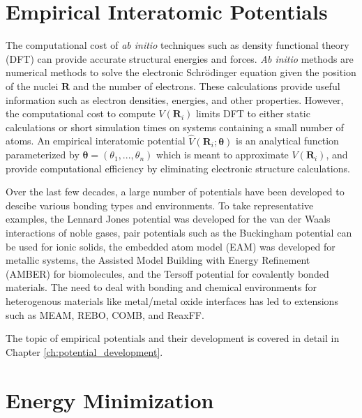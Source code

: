 \section{Empirical Interatomic Potentials}
The computational cost of \emph{ab initio} techniques such as density functional theory (DFT)\cite{hohenberg1964_dft,kohn1965_dft} can provide accurate structural energies and forces.    \emph{Ab initio} methods are numerical methods to solve the electronic Schr\"odinger equation given the position of the nuclei $\bm{R}$ and the number of electrons.  These calculations provide useful information such as electron densities, energies, and other properties. However, the computational cost to compute $V(\bm{R}_i)$  limits DFT to either static calculations or short simulation times on systems containing a small number of atoms.
An empirical interatomic potential $\hat{V}(\bm{R}_i;\bm{\theta})$ is an analytical function parameterized by $\bm{\theta}=(\theta_1,...,\theta_n)$ which is meant to approximate $V(\bm{R}_i)$, and provide computational efficiency by eliminating electronic structure calculations.

Over the last few decades, a large number of potentials have been developed to descibe various bonding types and environments.
To take representative examples, the Lennard Jones potential\cite{lennardjones1924_lj_pot} was developed for the van der Waals interactions of noble gases, pair potentials such as the Buckingham potential\cite{buckingham1938} can be used for ionic solids\cite{catlow1977_buckingham}, the embedded atom model (EAM)\cite{daw1983_eam,daw1984_eam} was developed for metallic systems,
the Assisted Model Building with Energy Refinement (AMBER)\cite{cornell1995_potential_amber} for biomolecules, and
the Tersoff potential\cite{tersoff1988_potential_1,tersoff1988_potential_2} for covalently bonded materials.
The need to deal with bonding and chemical environments for heterogenous materials like metal/metal oxide interfaces has led to extensions such as MEAM\cite{baskes1992_potential_meam},  REBO\cite{brenner1990_potential_rebo},  COMB\cite{liang2003_potential_comb},
and ReaxFF\cite{vanduin2001_reaxff}.

The topic of empirical potentials and their development is covered in detail in Chapter \ref{ch:potential_development}.

\section{Energy Minimization}

